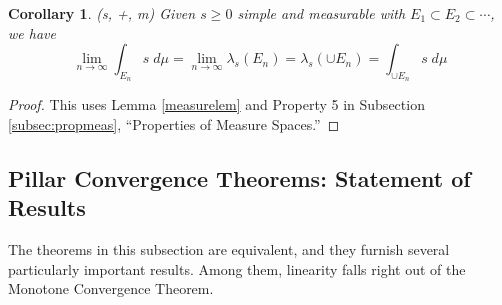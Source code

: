 \documentclass[12pt]{article}
\theoremstyle{plain}
\newtheorem{cor}[thm]{Corollary}
\theoremstyle{definition}
\theoremstyle{remark}
\begin{document}
\begin{cor}
\emph{(s, +, m)}
\label{cormtc}
Given $s\geq 0$ simple and measurable with $E_1\subset E_2\subset\cdots$, we have
\[
    \lim_{n\rightarrow\infty} \int_{E_n} s\;d\mu
    = \lim_{n\rightarrow\infty} \lambda_s(E_n) =
    \lambda_s(\cup E_n) 
    = \int_{\cup E_n} s \; d\mu
\]
\end{cor}
\begin{proof}
This uses Lemma \ref{measurelem} and Property 5 in Subsection \ref{subsec:propmeas}, ``Properties of Measure Spaces.''
\end{proof}

\newpage
\subsection{Pillar Convergence Theorems: Statement of Results}

The theorems in this subsection are equivalent, and they furnish several particularly important results. Among them, linearity falls right out of the Monotone Convergence Theorem.
\end{document}
